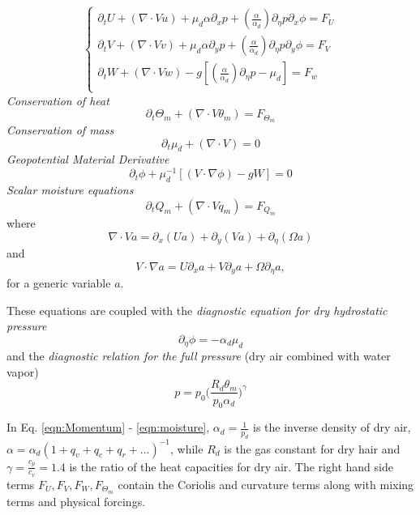 \documentclass{juliacon}
\begin{document}
\begin{equation}
\begin{cases}
\partial_t U + (\nabla \cdot Vu) + \mu_d\alpha\partial_x p + (\frac{\alpha}{\alpha_d})\partial_\eta p\partial_x \phi = F_U \\
\partial_t V + (\nabla \cdot Vv) + \mu_d\alpha\partial_y p + (\frac{\alpha}{\alpha_d})\partial_\eta p\partial_y \phi = F_V \\
\partial_t W + (\nabla \cdot Vw) - g[(\frac{\alpha}{\alpha_d})\partial_\eta p - \mu_d]= F_w \\
\end{cases}
\label{eqn:Momentum}
\end{equation}
\textit{Conservation of heat}
\begin{equation}
    \partial_t \Theta_m + (\nabla \cdot V\theta_m) = F_{\Theta_m}
    \label{eqn:Energy}
\end{equation}
\textit{Conservation of mass}
\begin{equation}
    \partial_t\mu_d + (\nabla \cdot V) = 0
\label{eqn:Mass}
\end{equation}
\textit{Geopotential Material Derivative}
\begin{equation}
    \partial_t\phi + \mu_d^{-1} [(V \cdot \nabla\phi) - gW] = 0
    \label{eqn:geopotential}
\end{equation}
\textit{Scalar moisture equations}
\begin{equation}
    \partial_t Q_m + (\nabla \cdot Vq_m) = F_{Q_m}
    \label{eqn:moisture}
\end{equation}
where $$\nabla \cdot Va= \partial_x(Ua) + \partial_y (Va) + \partial_\eta (\Omega a)$$ and $$V \cdot \nabla a= U\partial_xa + V\partial_ya + \Omega\partial_\eta a,$$ for a generic variable $a$.  

These equations are coupled with the \textit{diagnostic equation for dry hydrostatic pressure}
\begin{equation}
    \partial_{\eta} \phi = -\alpha_d\mu_d 
    \label{eqn:diagdry}
\end{equation}
and the \textit{ diagnostic relation for the full pressure} (dry air combined with water vapor)
\begin{equation}
    p=p_0 \Big (\frac{R_d\theta_m}{p_0\alpha_d}\Big)^{\gamma} 
\end{equation}

In Eq. \eqref{eqn:Momentum} - \eqref{eqn:moisture}, $\alpha_d = \frac{1}{p_d}$ is the inverse density of dry air, $\alpha= \alpha_d (1+q_v + q_c + q_r +...)^{-1}$, while $R_d$ is the gas constant for dry hair and $\gamma= \frac{c_p}{c_v}=1.4$ is the ratio of the heat capacities for dry air. The right hand side terms $F_U, F_V, F_W, F_{\Theta_m}$ contain the Coriolis and curvature terms along with mixing terms and physical forcings. 
\end{document}
